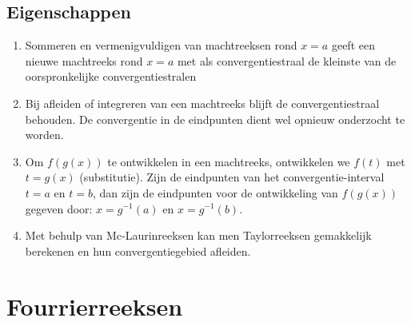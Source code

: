 	\subsection{Eigenschappen}
	\begin{enumerate}
		\item Sommeren en vermenigvuldigen van machtreeksen rond $x = a$ geeft een nieuwe machtreeks rond $x = a$ met als convergentiestraal de kleinste van de oorspronkelijke convergentiestralen
		\item Bij afleiden of integreren van een machtreeks blijft de convergentiestraal behouden. De convergentie in de eindpunten dient wel opnieuw onderzocht te worden.
		\item Om $f(g(x))$ te ontwikkelen in een machtreeks, ontwikkelen we $f(t)$ met $t = g(x)$ (substitutie). Zijn de eindpunten van het convergentie-interval $t = a$ en $t = b$, dan zijn de eindpunten voor de ontwikkeling van $f(g(x))$ gegeven door: $x = g^{-1}(a)$ en $x = g^{-1}(b)$.

		\item Met behulp van Mc-Laurinreeksen kan men Taylorreeksen gemakkelijk berekenen en hun convergentiegebied afleiden.
	\end{enumerate}


	\section{Fourrierreeksen}


